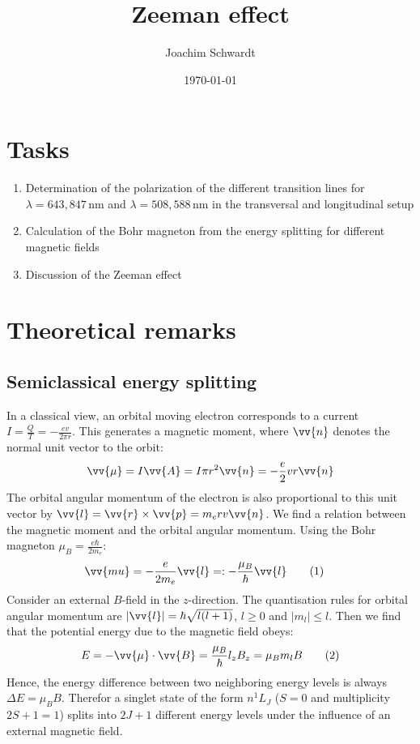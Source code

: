 \documentclass[a4paper,12pt]{article}
\newcommand\numberthis{\addtocounter{equation}{1}\tag{\theequation}}
\begin{document}
\title{Zeeman effect}
\author{Joachim Schwardt}
\date{\today}
\maketitle

\section{Tasks}
\begin{enumerate}
\item Determination of the polarization of the different transition lines for $\lambda=643,847\,$nm and $\lambda=508,588\,$nm in the transversal and longitudinal setup
\item Calculation of the Bohr magneton from the energy splitting for different magnetic fields 
\item Discussion of the Zeeman effect
\end{enumerate}
\section{Theoretical remarks}
\subsection{Semiclassical energy splitting}
In a classical view, an orbital moving electron corresponds to a current $I=\frac{Q}{T}=-\frac{ev}{2\pi r}$. This generates a magnetic moment, where $\vv{n}$ denotes the normal unit vector to the orbit:
$$\vv{\mu}=I\vv{A}=I\pi r^2\vv{n}=-\frac{e}{2}vr\vv{n}$$
The orbital angular momentum of the electron is also proportional to this unit vector by $\vv{l}=\vv{r}\times\vv{p}=m_erv\vv{n}$. We find a relation between the magnetic moment and the orbital angular momentum. Using the Bohr magneton $\mu_B=\frac{e\hbar}{2m_e}$:
\begin{align*}
\vv{mu}&=-\frac{e}{2m_e}\vv{l}=:-\frac{\mu_B}{\hbar}\vv{l}\numberthis\label{mu ist Bohr mal L}
\end{align*}
Consider an external $B$-field in the $z$-direction. The quantisation rules for orbital angular momentum are $|\vv{l}|=\hbar\sqrt{l(l+1)}$, $l\ge 0$ and $|m_l|\le l$. Then we find that the potential energy due to the magnetic field obeys:
\begin{align*}
E=-\vv{\mu}\cdot\vv{B}=\frac{\mu_B}{\hbar}l_zB_z=\mu_Bm_lB\numberthis\label{E von ml und B}
\end{align*}
Hence, the energy difference between two neighboring energy levels is always $\Delta E=\mu_BB$. Therefor a singlet state of the form $n^1L_J$ ($S=0$ and multiplicity $2S+1=1$) splits into $2J+1$ different energy levels under the influence of an external magnetic field. 
\end{document}
